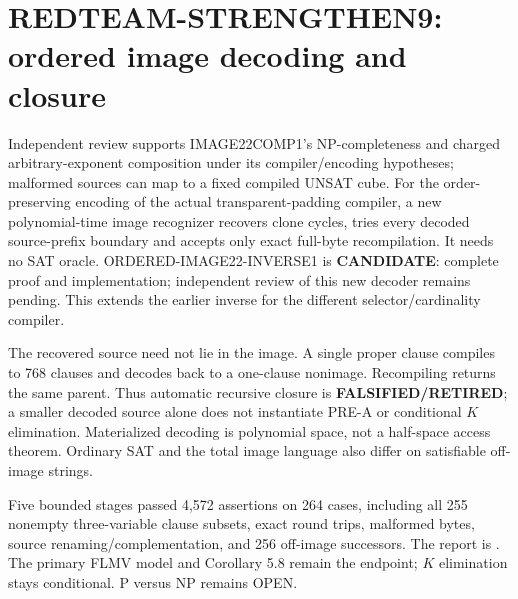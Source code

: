 \section{REDTEAM-STRENGTHEN9: ordered image decoding and closure}
Independent review supports IMAGE22COMP1's NP-completeness and charged
arbitrary-exponent composition under its compiler/encoding hypotheses;
malformed sources can map to a fixed compiled UNSAT cube.
For the order-preserving encoding of the actual transparent-padding
compiler, a new polynomial-time image recognizer recovers clone cycles,
tries every decoded source-prefix boundary and accepts only exact full-byte
recompilation. It needs no SAT oracle. ORDERED-IMAGE22-INVERSE1 is
\textbf{CANDIDATE}: complete proof and implementation; independent review
of this new decoder remains pending. This extends the earlier inverse for
the different selector/cardinality compiler.

The recovered source need not lie in the image. A single proper clause
compiles to 768 clauses and decodes back to a one-clause nonimage.
Recompiling returns the same parent. Thus automatic recursive closure is
\textbf{FALSIFIED/RETIRED}; a smaller decoded source alone does not instantiate
PRE-A or conditional $K$ elimination. Materialized decoding is polynomial
space, not a half-space access theorem. Ordinary SAT and the total image
language also differ on satisfiable off-image strings.

Five bounded stages passed 4,572 assertions on 264 cases, including all 255
nonempty three-variable clause subsets, exact round trips, malformed bytes,
source renaming/complementation, and 256 off-image successors.
The report is
.
The primary FLMV model and Corollary 5.8 remain the endpoint;
$K$ elimination stays conditional. P versus NP remains OPEN.

